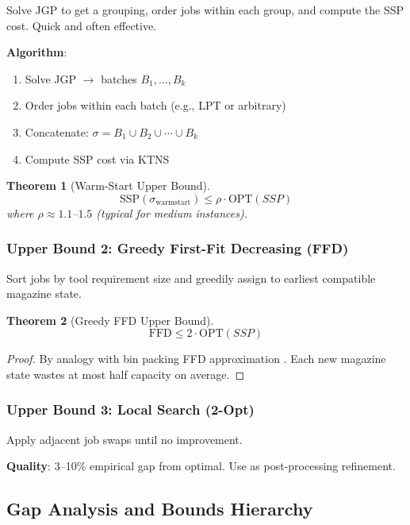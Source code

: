 \documentclass[12pt]{article}
\newtheorem{theorem}{Theorem}[section]
\begin{document}
	\begin{intuitionbox}
		Solve JGP to get a grouping, order jobs within each group, and compute the SSP cost. Quick and often effective.
	\end{intuitionbox}
	
	\textbf{Algorithm}:
	\begin{enumerate}
		\item Solve JGP $\to$ batches $B_1, \ldots, B_k$
		\item Order jobs within each batch (e.g., LPT or arbitrary)
		\item Concatenate: $\sigma = B_1 \cup B_2 \cup \cdots \cup B_k$
		\item Compute SSP cost via KTNS
	\end{enumerate}
	
	\begin{theorem}[Warm-Start Upper Bound]
		$$\text{SSP}(\sigma_{\text{warmstart}}) \le \rho \cdot \text{OPT}(SSP)$$
		where $\rho \approx 1.1$--$1.5$ (typical for medium instances).
	\end{theorem}
	
	\subsubsection{Upper Bound 2: Greedy First-Fit Decreasing (FFD)}
	
	Sort jobs by tool requirement size and greedily assign to earliest compatible magazine state.
	
	\begin{theorem}[Greedy FFD Upper Bound]
		$$\text{FFD} \le 2 \cdot \text{OPT}(SSP)$$
	\end{theorem}
	\begin{proof}
		By analogy with bin packing FFD approximation \citep{Johnson1973}. Each new magazine state wastes at most half capacity on average.
	\end{proof}
	
	\subsubsection{Upper Bound 3: Local Search (2-Opt)}
	
	Apply adjacent job swaps until no improvement.
	
	\textbf{Quality}: 3--10\% empirical gap from optimal. Use as post-processing refinement.
	
	\subsection{Gap Analysis and Bounds Hierarchy}
	
\end{document}

